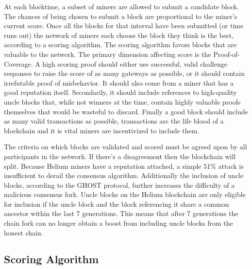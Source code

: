 \documentclass[letterpaper,11pt]{article}
\begin{document}
At each blocktime, a subset of miners are allowed to submit a candidate block. The chances of being chosen to submit a block are proportional to the miner's current score. Once all the blocks for that interval have been submitted (or time runs out) the network of miners each choose the block they think is the best, according to a scoring algorithm. The scoring algorithm favors blocks that are valuable to the network. The primary dimension affecting score is the Proof-of-Coverage. A high scoring proof should either use successful, valid challenge responses to raise the score of as many gateways as possible, or it should contain irrefutable proof of misbehavior. It should also come from a miner that has a good reputation itself. Secondarily, it should include references to high-quality uncle blocks that, while not winners at the time, contain highly valuable proofs themselves that would be wasteful to discard. Finally a good block should include as many valid transactions as possible, transactions are the life blood of a blockchain and it is vital miners are incentivized to include them.

The criteria on which blocks are validated and scored must be agreed upon by all participants in the network. If there's a disagreement then the blockchain will split. Because Helium miners have a reputation attached, a simple 51\% attack is insufficient to derail the consensus algorithm. Additionally the inclusion of uncle blocks, according to the GHOST protocol, further increases the difficulty of a malicious consensus fork. Uncle blocks on the Helium blockchain are only eligible for inclusion if the uncle block and the block referencing it share a common ancestor within the last 7 generations. This means that after 7 generations the chain fork can no longer obtain a boost from including uncle blocks from the honest chain.

\subsection{Scoring Algorithm}\label{scoring}
\end{document}
